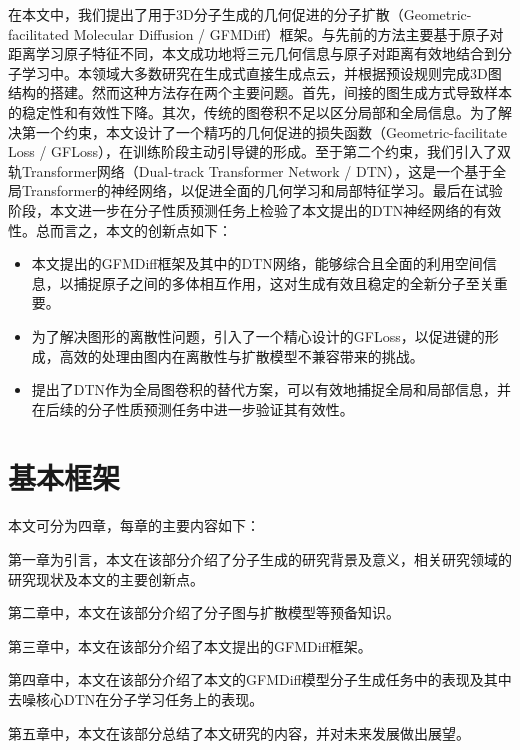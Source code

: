 在本文中，我们提出了用于3D分子生成的几何促进的分子扩散（Geometric-facilitated Molecular Diffusion / GFMDiff）框架。与先前的方法主要基于原子对距离学习原子特征不同，本文成功地将三元几何信息与原子对距离有效地结合到分子学习中。本领域大多数研究在生成式直接生成点云，并根据预设规则完成3D图结构的搭建。然而这种方法存在两个主要问题。首先，间接的图生成方式导致样本的稳定性和有效性下降。其次，传统的图卷积不足以区分局部和全局信息。为了解决第一个约束，本文设计了一个精巧的几何促进的损失函数（Geometric-facilitate Loss / GFLoss），在训练阶段主动引导键的形成。至于第二个约束，我们引入了双轨Transformer网络（Dual-track Transformer Network / DTN），这是一个基于全局Transformer的神经网络，以促进全面的几何学习和局部特征学习。最后在试验阶段，本文进一步在分子性质预测任务上检验了本文提出的DTN神经网络的有效性。总而言之，本文的创新点如下：
\begin{itemize}
    \item 本文提出的GFMDiff框架及其中的DTN网络，能够综合且全面的利用空间信息，以捕捉原子之间的多体相互作用，这对生成有效且稳定的全新分子至关重要。
    \item 为了解决图形的离散性问题，引入了一个精心设计的GFLoss，以促进键的形成，高效的处理由图内在离散性与扩散模型不兼容带来的挑战。
    \item 提出了DTN作为全局图卷积的替代方案，可以有效地捕捉全局和局部信息，并在后续的分子性质预测任务中进一步验证其有效性。
\end{itemize}

\section{基本框架}
本文可分为四章，每章的主要内容如下：

第一章为引言，本文在该部分介绍了分子生成的研究背景及意义，相关研究领域的研究现状及本文的主要创新点。

第二章中，本文在该部分介绍了分子图与扩散模型等预备知识。

第三章中，本文在该部分介绍了本文提出的GFMDiff框架。

第四章中，本文在该部分介绍了本文的GFMDiff模型分子生成任务中的表现及其中去噪核心DTN在分子学习任务上的表现。

第五章中，本文在该部分总结了本文研究的内容，并对未来发展做出展望。